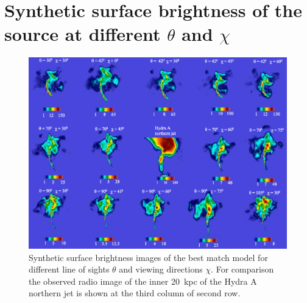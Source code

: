 \section{Synthetic surface brightness of the source at different $\theta$ and $\chi$}\label{A:morph}
\begin{figure}
\centering
\includegraphics[width=\textwidth]{fig10.eps}
\caption{ Synthetic surface brightness images of the best match model for different line of sights $\theta$ and viewing directions $\chi$. For comparison the observed radio image of the inner 20~kpc of the Hydra A northern jet is shown at the third column of second row. }
\label{f:morph}
\end{figure}






































%

